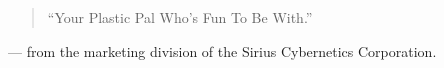 \thispagestyle{empty}

\begin{quote}``Your Plastic Pal Who's Fun To Be With.''\end{quote} --- from the marketing division of the Sirius Cybernetics Corporation. 
